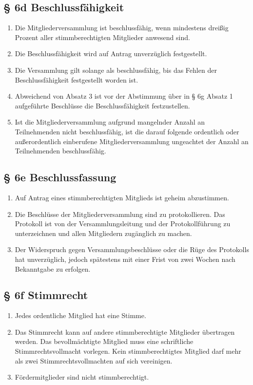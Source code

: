 \documentclass[11pt,a4paper]{scrartcl}
\begin{document}
\subsection*{§ 6d Beschlussfähigkeit}
\begin{enumerate}[label=\arabic*.]
    \item Die Mitgliederversammlung ist beschlussfähig, wenn mindestens dreißig Prozent aller stimmberechtigten Mitglieder anwesend sind.
    \item Die Beschlussfähigkeit wird auf Antrag unverzüglich festgestellt.
    \item Die Versammlung gilt solange als beschlussfähig, bis das Fehlen der Beschlussfähigkeit festgestellt worden ist.
    \item Abweichend von Absatz 3 ist vor der Abstimmung über in § 6g Absatz 1 aufgeführte Beschlüsse die Beschlussfähigkeit festzustellen.
    \item Ist die Mitgliederversammlung aufgrund mangelnder Anzahl an Teilnehmenden nicht beschlussfähig, ist die darauf folgende ordentlich oder außerordentlich einberufene Mitgliederversammlung ungeachtet der Anzahl an Teilnehmenden beschlussfähig.
\end{enumerate}

\subsection*{§ 6e Beschlussfassung}
\begin{enumerate}[label=\arabic*.]
    \item Auf Antrag eines stimmberechtigten Mitglieds ist geheim abzustimmen.
    \item Die Beschlüsse der Mitgliederversammlung sind zu protokollieren. Das Protokoll ist von der Versammlungsleitung und der Protokollführung zu unterzeichnen und allen Mitgliedern zugänglich zu machen.
    \item Der Widerspruch gegen Versammlungsbeschlüsse oder die Rüge des Protokolls hat unverzüglich, jedoch spätestens mit einer Frist von zwei Wochen nach Bekanntgabe zu erfolgen.
\end{enumerate}

\subsection*{§ 6f Stimmrecht}
\begin{enumerate}[label=\arabic*.]
    \item Jedes ordentliche Mitglied hat eine Stimme.
    \item Das Stimmrecht kann auf andere stimmberechtigte Mitglieder übertragen werden. Das bevollmächtigte Mitglied muss eine schriftliche Stimmrechtsvollmacht vorlegen. Kein stimmberechtigtes Mitglied darf mehr als zwei Stimmrechtsvollmachten auf sich vereinigen.
    \item Fördermitglieder sind nicht stimmberechtigt.
\end{enumerate}
\end{document}
